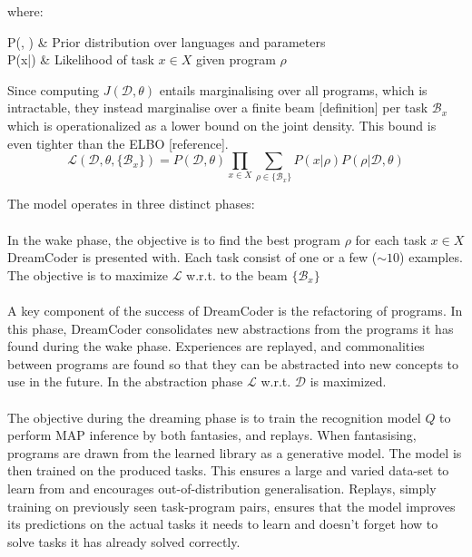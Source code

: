 where:
\begin{conditions*}
    P(, \theta) & Prior distribution over languages and parameters \\
    P(x|\rho) & Likelihood of task \(x \in X\) given program \(\rho\)
\end{conditions*}

Since computing \( J(\mathcal{D}, \theta) \) entails marginalising over all programs, which is intractable, they instead marginalise over a finite beam [definition] per task \( {\mathcal{B}_x} \) which is operationalized as a lower bound on the joint density. This bound is even tighter than the ELBO [reference].
\[
    \mathcal{L}(\mathcal{D}, \theta, \{\mathcal{B}_x\}) = P(\mathcal{D}, \theta) \prod_{x \in X} \sum_{\rho \in \{\mathcal{B}_x\}} P(x|\rho)P(\rho|\mathcal{D},\theta)
\]

The model operates in three distinct phases:

\paragraph{} In the wake phase, the objective is to find the best program $\rho$ for each task $x \in X$ DreamCoder is presented with. Each task consist of one or a few ($\sim10$) examples.
The objective is to maximize \(\mathcal{L}\) w.r.t. to the beam \(\{\mathcal{B}_x\}\)

\paragraph{} A key component of the success of DreamCoder is the refactoring of programs. In this phase, DreamCoder consolidates new abstractions from the programs it has found during the wake phase. Experiences are replayed, and commonalities between programs are found so that they can be abstracted into new concepts to use in the future. 
In the abstraction phase \(\mathcal{L}\) w.r.t. \(\mathcal{D}\) is maximized.

\paragraph{} The objective during the dreaming phase is to train the recognition model $Q$ to perform MAP inference by both fantasies, and replays. When fantasising, programs are drawn from the learned library as a generative model. The model is then trained on the produced tasks. This ensures a large and varied data-set to learn from and encourages out-of-distribution generalisation. Replays, simply training on previously seen task-program pairs, ensures that the model improves its predictions on the actual tasks it needs to learn and doesn't forget how to solve tasks it has already solved correctly.

